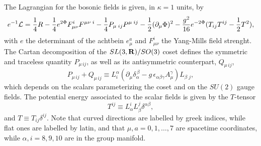 \documentclass[12pt,a4paper]{article}
\begin{document}
The Lagrangian for the bosonic fields is given, in $\kappa=1$ units, by 
\begin{equation}
e^{-1} {\cal L} = \frac {1}{4} R - \frac {1}{4} e^{2 \Phi} F_{\mu \nu}^{i} F^{\mu \nu \; i} - 
\frac {1}{4} P_{\mu \; ij} P^{\mu \; ij} - \frac {1}{2} (\partial_{\mu} \Phi)^2 - 
\frac {g^2}{16} e^{-2 \Phi} ( T_{ij} T^{ij} - \frac {1}{2} T^2),
\label{1}
\end{equation}
with $e$ the determinant of the achtbein $e^{a}_{\mu}$ and $F_{\mu \nu}^{i}$ the Yang-Mills 
field strenght. The Cartan decomposition of the $SL(3, {\bf R})/SO(3)$ coset defines the 
symmetric and traceless quantity $P_{\mu \, ij}$, as well as its antisymmetric counterpart, 
$Q_{\mu \, ij}$,
\begin{equation}
P_{\mu \, ij} + Q_{\mu \, ij} \equiv L_i^{\alpha} ( \partial_{\mu} \delta_{\alpha}^{\, \beta} 
- g \, \epsilon_{\alpha \beta \gamma} A^{\gamma}_{\mu}) L_{\beta \; j},
\label{2}
\end{equation}
which depends on the scalars parameterizing the coset and on the $SU(2)$ gauge fields. The 
potential energy associated to the scalar fields is given by the $T$-tensor
\begin{equation}
T^{ij} \equiv L^{i}_{\alpha} L^{j}_{\beta} \delta^{\alpha \beta},
\label{3}
\end{equation}
and $T \equiv T_{ij} \delta^{ij}$. Note that curved directions are labelled by greek indices, while 
flat ones are labelled by latin, and that $\mu, a = 0,1, \ldots, 7$ are spacetime coordinates, 
while $\alpha, i = 8,9,10$ are in the group manifold.
  
\end{document}
